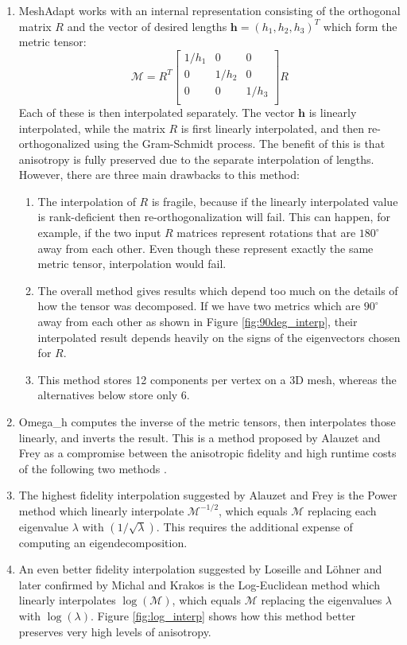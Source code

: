 \begin{enumerate}
\item MeshAdapt works with an internal representation consisting
of the orthogonal matrix $R$ and the vector of desired lengths
$\mathbf{h} = (h_1, h_2, h_3)^T$ which form the metric tensor:
\begin{equation}
\mathcal{M} = R^T \begin{bmatrix}
1 / h_1 & 0 & 0 \\
0 & 1 / h_2 & 0 \\
0 & 0 & 1 / h_3 \\
\end{bmatrix} R
\end{equation}
Each of these is then interpolated separately.
The vector $\mathbf{h}$ is linearly interpolated, while the
matrix $R$ is first linearly interpolated, and then re-orthogonalized
using the Gram-Schmidt process.
The benefit of this is that anisotropy is fully preserved due to the
separate interpolation of lengths.
However, there are three main drawbacks to this method:
\begin{enumerate}
\item The interpolation of $R$ is fragile, because if the linearly
interpolated value is rank-deficient then re-orthogonalization
will fail. This can happen, for example, if the two input $R$ matrices
represent rotations that are $180^{\circ}$ away from each other.
Even though these represent exactly the same metric tensor, interpolation
would fail.
\item The overall method gives results which depend too much on the
details of how the tensor was decomposed.
If we have two metrics which are $90^{\circ}$ away from each other
as shown in Figure \ref{fig:90deg_interp},
their interpolated result depends heavily on the signs of the eigenvectors
chosen for $R$.
\item This method stores 12 components per vertex on a 3D mesh, whereas
the alternatives below store only 6.
\end{enumerate}
\item Omega\_h computes the inverse of the metric tensors, then
interpolates those linearly, and inverts the result.
This is a method proposed by Alauzet and Frey as a compromise between
the anisotropic fidelity and high runtime costs of the following two methods
\cite{alauzet2003estimateur}.
\item The highest fidelity interpolation suggested by Alauzet and Frey is
the Power method which linearly interpolate $\mathcal{M}^{-1/2}$,
which equals $\mathcal{M}$ replacing each eigenvalue $\lambda$
with $(1/\sqrt{\lambda})$.
This requires the additional expense of computing an eigendecomposition.
\item An even better fidelity interpolation suggested by Loseille and
L{\"o}hner \cite{loseille20093d} and later confirmed by
Michal and Krakos \cite{michal2012anisotropic} is the Log-Euclidean
method which linearly interpolates $\log(\mathcal{M})$, which equals
$\mathcal{M}$ replacing the eigenvalues $\lambda$ with $\log(\lambda)$.
Figure \ref{fig:log_interp} shows how this method better preserves
very high levels of anisotropy.
\end{enumerate}

